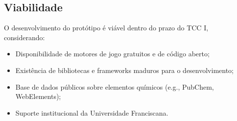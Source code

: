 \subsection{Viabilidade}

O desenvolvimento do protótipo é viável dentro do prazo do TCC I, considerando:

\begin{itemize}
    \item Disponibilidade de motores de jogo gratuitos e de código aberto;
    \item Existência de bibliotecas e frameworks maduros para o desenvolvimento;
    \item Base de dados públicos sobre elementos químicos (e.g., PubChem, WebElements);
    \item Suporte institucional da Universidade Franciscana.
\end{itemize}

